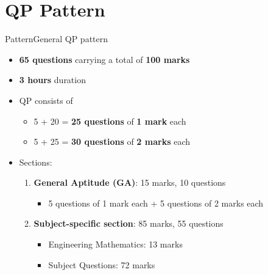 \documentclass[handout]{beamer}
\begin{document}
\section{QP Pattern}
\begin{frame}{Pattern}{General QP pattern}
    \begin{itemize}
        \item \textbf{65 questions} carrying a total of \textbf{100 marks}
        \item \textbf{3 hours} duration
        \item QP consists of
              \begin{itemize}
                  \item 5 + 20 = \textbf{25 questions} of \textbf{1 mark} each
                  \item 5 + 25 = \textbf{30 questions} of \textbf{2 marks} each
              \end{itemize}
        \item Sections:
              \begin{enumerate}
                  \item \textbf{General Aptitude (GA)}: 15 marks, 10 questions
                        \begin{itemize}
                            \item 5 questions of 1 mark each + 5 questions of 2 marks each
                        \end{itemize}
                  \item \textbf{Subject-specific section}: 85 marks, 55 questions
                        \begin{itemize}
                            \item Engineering Mathematics: 13 marks
                            \item Subject Questions: 72 marks
                        \end{itemize}
              \end{enumerate}
    \end{itemize}
\end{frame}
\end{document}
